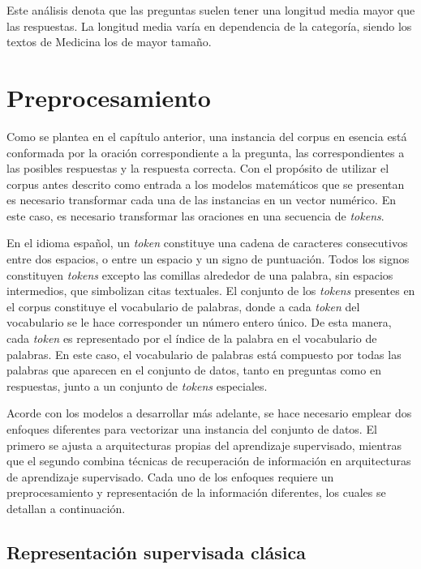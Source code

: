 Este análisis denota que las preguntas suelen tener una longitud media mayor que las respuestas. La longitud media varía en dependencia de la categoría, siendo los textos de Medicina los de mayor tamaño. 

\section{Preprocesamiento}

Como se plantea en el capítulo anterior, una instancia del corpus en esencia está conformada por la oración correspondiente a la pregunta, las correspondientes a las posibles respuestas y la respuesta correcta. Con el propósito de utilizar el corpus antes descrito como entrada a los modelos matemáticos que se presentan es necesario transformar cada una de las instancias en un vector numérico. En este caso, es necesario transformar las oraciones en una secuencia de \textit{tokens}.

En el idioma español, un \textit{token} constituye una cadena de caracteres consecutivos entre dos espacios, o entre un espacio y un signo de puntuación. Todos los signos constituyen \textit{tokens} excepto las comillas alrededor de una palabra, sin espacios intermedios, que simbolizan citas textuales. El conjunto de los \textit{tokens} presentes en el corpus constituye el vocabulario de palabras, donde a cada \textit{token} del vocabulario se le hace corresponder un número entero único. De esta manera, cada \textit{token} es representado por el índice de la palabra en el vocabulario de palabras. En este caso, el vocabulario de palabras está compuesto por todas las palabras que aparecen en el conjunto de datos, tanto en preguntas como en respuestas, junto a un conjunto de \textit{tokens} especiales.

Acorde con los modelos a desarrollar más adelante, se hace necesario emplear dos enfoques diferentes para vectorizar una instancia del conjunto de datos. El primero se ajusta a arquitecturas propias del aprendizaje supervisado, mientras que el segundo combina técnicas de recuperación de información en arquitecturas de aprendizaje supervisado. Cada uno de los enfoques requiere un preprocesamiento y representación de la información diferentes, los cuales se detallan a continuación.

\subsection{Representación supervisada clásica}

